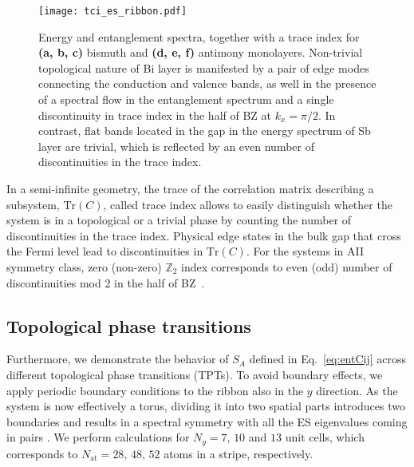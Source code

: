 \begin{figure}[H]
\centering
\texttt{[image: tci\_es\_ribbon.pdf]}
\caption[Energy and entanglement spectra, together with a trace index for bismuth and antimony monolayers]{Energy and entanglement spectra, together with a trace index for \textbf{(a, b, c)} bismuth and \textbf{(d, e, f)} antimony monolayers. Non-trivial topological nature of Bi layer is manifested by a pair of edge modes connecting the conduction and valence bands, as well in the presence of a spectral flow in the entanglement spectrum and a single discontinuity in trace index in the half of BZ at $k_x = \pi / 2$. In contrast, flat bands located in the gap in the energy spectrum of Sb layer are trivial, which is reflected by an even number of discontinuities in the trace index.}
\label{fig:ribbon}
\end{figure}

In a semi-infinite geometry, the trace of the correlation matrix describing a subsystem, $\mathrm{Tr} (C)$, called trace index allows to easily distinguish whether the system is in a topological or a trivial phase by counting the number of discontinuities in the trace index. Physical edge states in the bulk gap that cross the Fermi level lead to discontinuities in $\mathrm{Tr} (C)$. For the systems in AII symmetry class, zero (non-zero) $\mathbb{Z}_2$ index corresponds to even (odd) number of discontinuities mod 2 in the half of BZ~\cite{Hughes:inv}. 

\subsection{Topological phase transitions}
Furthermore, we demonstrate the behavior of $S_A$ defined in Eq.~\eqref{eq:entCij} across different topological phase transitions (TPTs). To avoid boundary effects, we apply periodic boundary conditions to the ribbon also in the $y$ direction. As the system is now effectively a torus, dividing it into two spatial parts introduces two boundaries and results in a spectral symmetry with all the ES eigenvalues coming in pairs \cite{Sondhi:univ}. We perform calculations for $N_y = 7, \, 10$ and $13$ unit cells, which corresponds to $N_{\mathrm{at}} = 28, \, 48, \, 52$ atoms in a stripe, respectively. 

